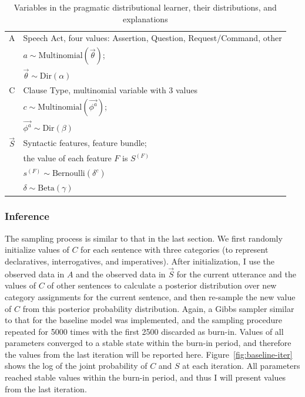 \begin{table}[H]
    \centering
    \begin{tabular}{c|l}
    \hline
    \hline
    
        A & Speech Act, four values: Assertion, Question, Request/Command, other\\
        & $ a \sim \mbox{Multinomial}(\vec{\theta})$;\\
        & $\vec{\theta} \sim \mbox{Dir}(\alpha)$\\
\hline
        C &  Clause Type, multinomial variable with 3 values\\
        & $ c \sim  \mbox{Multinomial}(\vec{\phi^{a}})$;\\
        &$\vec{\phi^{a}} \sim \mbox{Dir}(\beta)$\\
\hline
        $\vec{S}$ &  Syntactic features, feature bundle; \\
        & the value of each feature $F$ is $S^{(F)}$ \\
        & $s^{(F)} \sim \mbox{Bernoulli}(\delta^{c})$ \\
        &$\delta\sim \mbox{Beta}(\gamma)$\\
    \hline
    \hline
    \end{tabular}
    \caption{Variables in the pragmatic distributional learner, their distributions, and explanations}
    \label{tab:target-variables}
\end{table}


\subsubsection{Inference}
\label{sec:engcl:model:prag:infer}




The sampling process is similar to that in the last section. We first randomly initialize values of $C$ for each sentence with three categories (to represent declaratives, interrogatives, and imperatives). After initialization, I use the observed data in $A$ and the observed data in $\vec{S}$ for the current utterance and the values of $C$ of other sentences to calculate a posterior distribution over new category assignments for the current sentence, and then re-sample the new value of $C$ from this posterior probability distribution. Again, a Gibbs sampler similar to that for the baseline model was implemented, and the sampling procedure repeated for 5000 times with the first 2500 discarded as burn-in. Values of all parameters converged to a stable state within the burn-in period, and therefore the values from the last iteration will be reported here.  Figure~\ref{fig:baseline-iter} shows the log of the joint probability of $C$ and $S$ at each iteration.  All parameters reached stable values within the burn-in period, and thus I will present values from the last iteration. %


